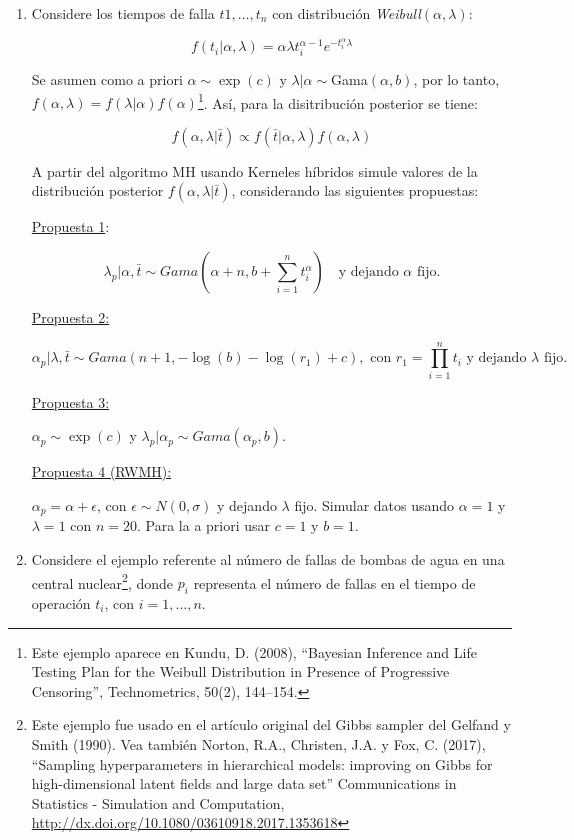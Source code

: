 \documentclass{article}
\begin{document}
\begin{enumerate}
    \item Considere los tiempos de falla $t1, \dots, t_n$ con distribución 
    \textit{Weibull}$(\alpha, \lambda)$:
    
    \[ f (t_i|\alpha, \lambda) = \alpha\lambda t^{\alpha-1}_i e^{-t^\alpha_i 
    \lambda} \]
    
    Se asumen como a priori $\alpha \sim \exp(c)$ y $\lambda|\alpha \sim 
    $Gama$(\alpha, b)$, por lo tanto, $f (\alpha, \lambda) = f (\lambda|\alpha) 
    f (\alpha)$\footnote{Este ejemplo aparece en Kundu, D. (2008), ``Bayesian 
    Inference and Life Testing Plan for the Weibull Distribution in Presence of 
    Progressive Censoring'', Technometrics, 50(2), 144–154.}. Así, para la 
    disitribución posterior se tiene:
    
    \[f (\alpha, \lambda|\bar t) \propto f (\bar t|\alpha, \lambda)f (\alpha, 
    \lambda)\]
    
    A partir del algoritmo MH usando Kerneles híbridos simule valores de la distribución 
    posterior $f(\alpha, \lambda|\bar t)$, considerando las siguientes propuestas:


    \underline{Propuesta 1}:

    \[ \lambda_p|\alpha, \bar t \sim Gama \left(\alpha + n , b +\sum_{i=1}^n 
    t^\alpha_i \right) \quad \text{y dejando $\alpha$ fijo.} \]

    \underline{Propuesta 2:}

    \[\alpha_p|\lambda, \bar t \sim Gama (n + 1 , -\log(b) - \log(r_1) + c), 
    \text{ con } r_1 = \prod_{i=1}^n t_i \text{ y dejando $\lambda$ fijo. }\]
    
    \underline{Propuesta 3:}
    
    $\alpha_p \sim \exp(c)$ y $\lambda_p|\alpha_p \sim Gama(\alpha_p, b)$.

    \underline{Propuesta 4 (RWMH):} 
    
    $\alpha_p = \alpha + \epsilon$, con $\epsilon \sim N (0, \sigma)$ y dejando 
    $\lambda$ fijo. Simular datos usando $\alpha = 1$ y $\lambda = 1$ con $n = 20$. 
    Para la a priori usar $c = 1$ y $b = 1$.



    \item Considere el ejemplo referente al número de fallas de bombas de agua en 
    una central nuclear\footnote{Este ejemplo fue usado en el artículo original 
    del Gibbs sampler del Gelfand y Smith (1990). Vea también Norton, R.A., 
    Christen, J.A. y Fox, C. (2017), ``Sampling hyperparameters in hierarchical 
    models: improving on Gibbs for high-dimensional latent fields and large data 
    set'' Communications in Statistics - Simulation and Computation, 
    \url{http://dx.doi.org/10.1080/03610918.2017.1353618} }, donde $p_i$ 
    representa el número de fallas en el tiempo de operación $t_i$, con $i = 1, 
    \dots, n$.


\end{enumerate}
\end{document}
